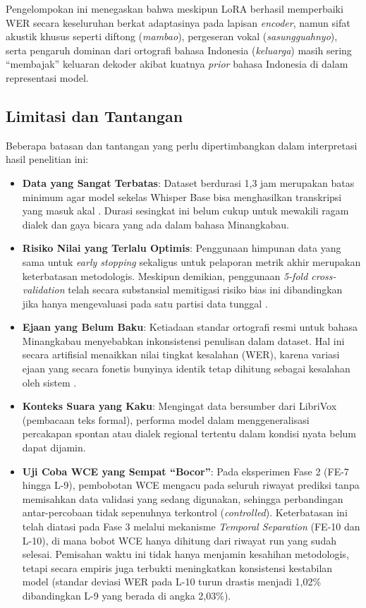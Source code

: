 Pengelompokan ini menegaskan bahwa meskipun LoRA berhasil memperbaiki WER secara keseluruhan berkat adaptasinya pada lapisan \textit{encoder}, namun sifat akustik khusus seperti diftong (\textit{mambao}), pergeseran vokal (\textit{sasungguahnyo}), serta pengaruh dominan dari ortografi bahasa Indonesia (\textit{keluarga}) masih sering ``membajak'' keluaran dekoder akibat kuatnya \textit{prior} bahasa Indonesia di dalam representasi model.

\subsection{Limitasi dan Tantangan}

Beberapa batasan dan tantangan yang perlu dipertimbangkan dalam interpretasi hasil penelitian ini:

\begin{itemize}
    \item \textbf{Data yang Sangat Terbatas}: Dataset berdurasi 1,3 jam merupakan batas minimum agar model sekelas Whisper Base bisa menghasilkan transkripsi yang masuk akal \cite{liang2025fieldmatters}. Durasi sesingkat ini belum cukup untuk mewakili ragam dialek dan gaya bicara yang ada dalam bahasa Minangkabau.

    \item \textbf{Risiko Nilai yang Terlalu Optimis}: Penggunaan himpunan data yang sama untuk \textit{early stopping} sekaligus untuk pelaporan metrik akhir merupakan keterbatasan metodologis. Meskipun demikian, penggunaan \textit{5-fold cross-validation} telah secara substansial memitigasi risiko bias ini dibandingkan jika hanya mengevaluasi pada satu partisi data tunggal \cite{kohavi1995crossvalidation}.

    \item \textbf{Ejaan yang Belum Baku}: Ketiadaan standar ortografi resmi untuk bahasa Minangkabau menyebabkan inkonsistensi penulisan dalam dataset. Hal ini secara artifisial menaikkan nilai tingkat kesalahan (WER), karena variasi ejaan yang secara fonetis bunyinya identik tetap dihitung sebagai kesalahan oleh sistem \cite{koto2020minangkabau, sovia2022minangkabau}.

    \item \textbf{Konteks Suara yang Kaku}: Mengingat data bersumber dari LibriVox (pembacaan teks formal), performa model dalam menggeneralisasi percakapan spontan atau dialek regional tertentu dalam kondisi nyata belum dapat dijamin.

    \item \textbf{Uji Coba WCE yang Sempat ``Bocor''}: Pada eksperimen Fase 2 (FE-7 hingga L-9), pembobotan WCE mengacu pada seluruh riwayat prediksi tanpa memisahkan data validasi yang sedang digunakan, sehingga perbandingan antar-percobaan tidak sepenuhnya terkontrol (\textit{controlled}). Keterbatasan ini telah diatasi pada Fase 3 melalui mekanisme \textit{Temporal Separation} (FE-10 dan L-10), di mana bobot WCE hanya dihitung dari riwayat run yang sudah selesai. Pemisahan waktu ini tidak hanya menjamin kesahihan metodologis, tetapi secara empiris juga terbukti meningkatkan konsistensi kestabilan model (standar deviasi WER pada L-10 turun drastis menjadi 1,02\% dibandingkan L-9 yang berada di angka 2,03\%).
\end{itemize}
\clearpage
\null
\thispagestyle{empty}
\newpage
\clearpage
